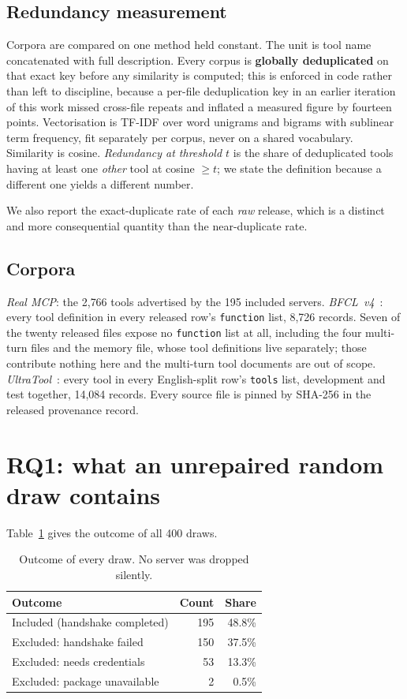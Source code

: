 \documentclass[11pt]{article}
\begin{document}
\subsection{Redundancy measurement}
Corpora are compared on one method held constant. The unit is tool name
concatenated with full description. Every corpus is \textbf{globally
deduplicated} on that exact key before any similarity is computed; this is
enforced in code rather than left to discipline, because a per-file deduplication
key in an earlier iteration of this work missed cross-file repeats and inflated a
measured figure by fourteen points. Vectorisation is TF-IDF over word unigrams and
bigrams with sublinear term frequency, fit separately per corpus, never on a
shared vocabulary. Similarity is cosine. \emph{Redundancy at threshold $t$} is the
share of deduplicated tools having at least one \emph{other} tool at cosine
$\geq t$; we state the definition because a different one yields a different
number.

We also report the exact-duplicate rate of each \emph{raw} release, which is a
distinct and more consequential quantity than the near-duplicate rate.

\subsection{Corpora}
\emph{Real MCP}: the 2{,}766 tools advertised by the 195 included servers.
\emph{BFCL~v4}~\cite{bfcl}: every tool definition in every released row's
\texttt{function} list, 8{,}726 records. Seven of the twenty released files expose no
\texttt{function} list at all, including the four multi-turn files and the memory
file, whose tool definitions live separately; those contribute nothing here and
the multi-turn tool documents are out of scope. \emph{UltraTool}~\cite{ultratool}:
every tool in every English-split row's \texttt{tools} list, development and test
together, 14{,}084 records. Every source file is pinned by SHA-256 in the released
provenance record.

\section{RQ1: what an unrepaired random draw contains}
\label{sec:draw}

Table~\ref{tab:inclusion} gives the outcome of all 400 draws.

\begin{table}[h]
\centering
\begin{tabular}{lrr}
\toprule
Outcome & Count & Share \\
\midrule
Included (handshake completed)      & 195 & 48.8\% \\
Excluded: handshake failed          & 150 & 37.5\% \\
Excluded: needs credentials         & 53  & 13.3\% \\
Excluded: package unavailable       & 2   & 0.5\%  \\
\bottomrule
\end{tabular}
\caption{Outcome of every draw. No server was dropped silently.}
\label{tab:inclusion}
\end{table}
\end{document}
